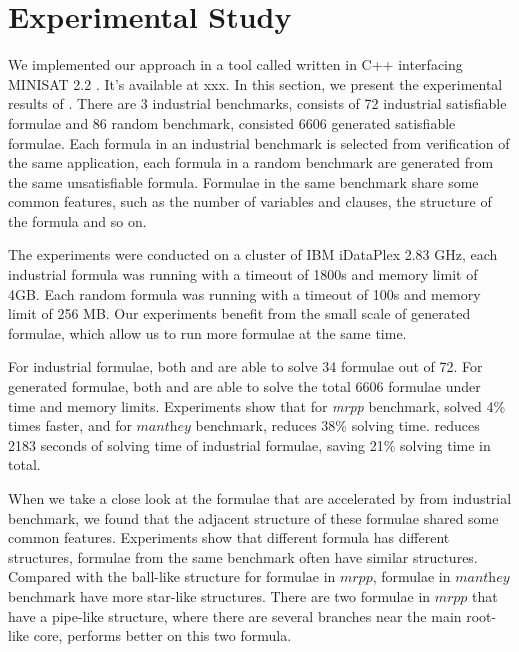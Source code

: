 \section{Experimental Study}\label{sec:expr}
We implemented our approach in a tool called \tool written in C++ interfacing MINISAT 2.2 \cite{MINISAT}.
It's available at xxx.
In this section, we present the experimental results of \tool.
There are 3 industrial benchmarks, consists of 72 industrial satisfiable formulae and 86 random benchmark, consisted 6606 generated satisfiable formulae. Each formula in an industrial benchmark is selected from verification of the same application, each formula in a random benchmark are generated from the same unsatisfiable formula. Formulae in the same benchmark share some common features, such as the number of variables and clauses, the structure of the formula and so on.

The experiments were conducted on a cluster of IBM iDataPlex 2.83 GHz, each industrial formula was running with a timeout of 1800s and memory limit of 4GB. Each random formula was running with a timeout of 100s and memory limit of 256 MB. Our experiments benefit from the small scale of generated formulae, which allow us to run more formulae at the same time.

For industrial formulae, both \tool and \minibones are able to solve 34 formulae out of 72. For generated formulae, both \tool and \minibones are able to solve the total 6606 formulae under time and memory limits.
Experiments show that for \textit{mrpp} benchmark, \minibones solved 4\% times faster, and for $\textit{manthey}$ benchmark, \tool reduces 38\% solving time. \tool reduces 2183 seconds of solving time of industrial formulae, saving 21\% solving time in total.

When we take a close look at the formulae that are accelerated by \tool from industrial benchmark, we found that the adjacent structure of these formulae shared some common features. Experiments show that different formula has different structures, formulae from the same benchmark often have similar structures. Compared with the ball-like structure for formulae in $\textit{mrpp}$, formulae in $\textit{manthey}$ benchmark have more star-like structures. There are two formulae in $\textit{mrpp}$ that have a pipe-like structure, where there are several branches near the main root-like core, \tool performs better on this two formula.
